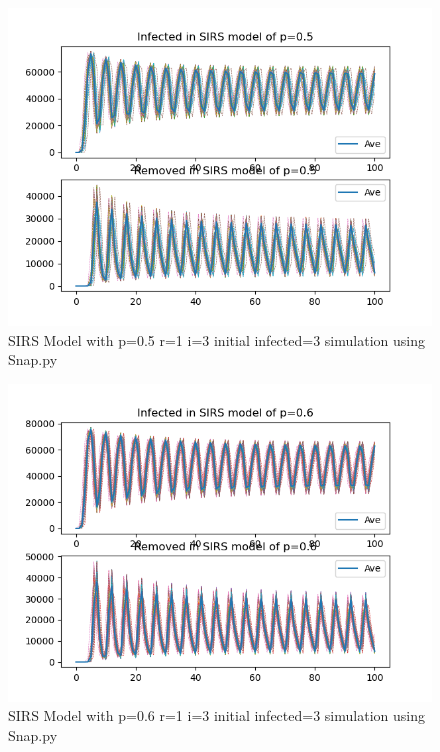 \documentclass{subfile}
\begin{document}
  \begin{figure}
  \includegraphics[scale=0.8]{sirsp05r1i3s3}
  \caption[SIRS p=0.5,r=1,i=3,init infected=3]{SIRS Model with p=0.5 r=1 i=3 initial infected=3 simulation using Snap.py}
  \end{figure}
  \begin{figure}
  \includegraphics[scale=0.8]{sirsp06r1i3s3}
  \caption[SIRS p=0.6,r=1,i=3,init infected=3]{SIRS Model with p=0.6 r=1 i=3 initial infected=3 simulation using Snap.py}
  \end{figure}
\end{document}
